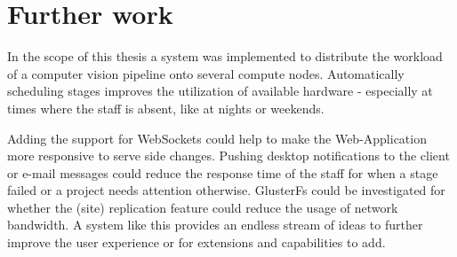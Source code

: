 \chapter{Further work}

In the scope of this thesis a system was implemented to distribute the workload of a computer vision pipeline onto several compute nodes.
Automatically scheduling stages improves the utilization of available hardware - especially at times where the staff is absent, like at nights or weekends.

Adding the support for WebSockets could help to make the Web-Application more responsive to serve side changes.
Pushing desktop notifications to the client or e-mail messages could reduce the response time of the staff for when a stage failed or a project needs attention otherwise.
GlusterFs could be investigated for whether the (site) replication feature could reduce the usage of network bandwidth.
A system like this provides an endless stream of ideas to further improve the user experience or for extensions and capabilities to add.